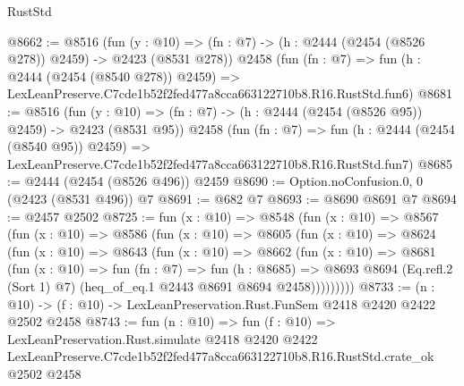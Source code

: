 \begin{lexlean}{RustStd}
\begin{coremodule}
@8662 := @8516
    (fun (y : @10) => (fn : @7) -> (h : @2444 (@2454 (@8526 @278)) @2459) -> @2423 (@8531 @278))
    @2458
    (fun (fn : @7) =>
    fun (h : @2444 (@2454 (@8540 @278)) @2459) =>
    LexLeanPreserve.C7cde1b52f2fed477a8cca663122710b8.R16.RustStd.fun6)
@8681 := @8516
    (fun (y : @10) => (fn : @7) -> (h : @2444 (@2454 (@8526 @95)) @2459) -> @2423 (@8531 @95))
    @2458
    (fun (fn : @7) =>
    fun (h : @2444 (@2454 (@8540 @95)) @2459) =>
    LexLeanPreserve.C7cde1b52f2fed477a8cca663122710b8.R16.RustStd.fun7)
@8685 := @2444 (@2454 (@8526 @496)) @2459
@8690 := Option.noConfusion.{0, 0} (@2423 (@8531 @496)) @7
@8691 := @682 @7
@8693 := @8690 @8691 @7
@8694 := @2457 @2502
@8725 := fun (x : @10) =>
  @8548
    (fun (x : @10) =>
    @8567
      (fun (x : @10) =>
      @8586
        (fun (x : @10) =>
        @8605
          (fun (x : @10) =>
          @8624
            (fun (x : @10) =>
            @8643
              (fun (x : @10) =>
              @8662
                (fun (x : @10) =>
                @8681
                  (fun (x : @10) =>
                  fun (fn : @7) =>
                  fun (h : @8685) =>
                  @8693
                    @8694
                    (Eq.refl.{2} (Sort 1) @7)
                    (heq_of_eq.{1} @2443 @8691 @8694 @2458)))))))))
@8733 := (n : @10) -> (f : @10) -> LexLeanPreservation.Rust.FunSem @2418 @2420 @2422 @2502 @2458
@8743 := fun (n : @10) =>
  fun (f : @10) =>
  LexLeanPreservation.Rust.simulate
    @2418
    @2420
    @2422
    LexLeanPreserve.C7cde1b52f2fed477a8cca663122710b8.R16.RustStd.crate_ok
    @2502
    @2458
\end{coremodule}
\end{lexlean}
